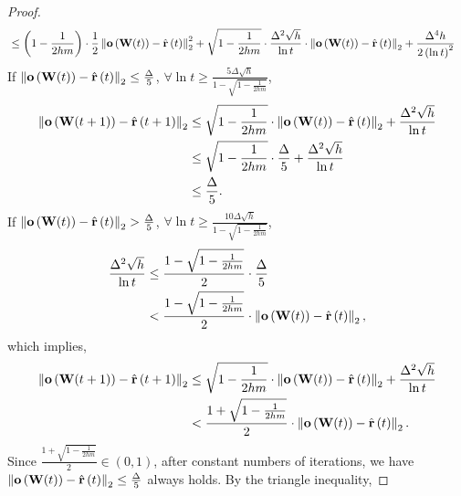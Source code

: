 \begin{proof}
\begin{equation*}
\begin{split}
    &\le \left( 1 - \frac{1}{2 h m } \right) \cdot \frac{1}{2} \left\| {\mathbf{o}}\left( {\mathbf{W}}(t) \right) - \hat{{\mathbf{r}}}\left(t\right)\right\|_2^2 + \sqrt{1 - \frac{1}{2 h m } } \cdot \frac{\Delta^2 \sqrt{h}}{\ln{t}} \cdot \left\| {\mathbf{o}}\left( {\mathbf{W}}(t) \right) - \hat{{\mathbf{r}}}\left(t\right)\right\|_2 + \frac{\Delta^4 h}{2 \left( \ln{t} \right)^2 }
\end{split}
\end{equation*}
If $\left\| {\mathbf{o}}\left( {\mathbf{W}}(t) \right) - \hat{{\mathbf{r}}}\left(t\right)\right\|_2 \le \frac{\Delta}{5}$, $\forall \ln{t} \ge \frac{5 \Delta \sqrt{h}}{1 - \sqrt{1 - \frac{1}{2 h m}}}$,
\begin{equation*}
\begin{split}
    \left\| {\mathbf{o}}\left( {\mathbf{W}}(t+1) \right) - \hat{{\mathbf{r}}}\left(t+1\right)\right\|_2 &\le \sqrt{1 - \frac{1}{2 h m}} \cdot \left\| {\mathbf{o}}\left( {\mathbf{W}}(t) \right) - \hat{{\mathbf{r}}}\left(t\right)\right\|_2 + \frac{\Delta^2 \sqrt{h}}{\ln{t}} \\
    &\le \sqrt{1 - \frac{1}{2 h m}} \cdot \frac{\Delta}{5} + \frac{\Delta^2 \sqrt{h}}{\ln{t}} \\
    &\le \frac{\Delta}{5}.
\end{split}
\end{equation*}
If $\left\| {\mathbf{o}}\left( {\mathbf{W}}(t) \right) - \hat{{\mathbf{r}}}\left(t\right)\right\|_2 > \frac{\Delta}{5}$, $\forall \ln{t} \ge \frac{10 \Delta \sqrt{h}}{1 - \sqrt{1 - \frac{1}{2 h m}}}$,
\begin{equation*}
\begin{split}
    \frac{\Delta^2 \sqrt{h}}{\ln{t}} &\le \frac{1 - \sqrt{1 - \frac{1}{2 h m}}}{2} \cdot \frac{\Delta}{5} \\
    &< \frac{1 - \sqrt{1 - \frac{1}{2 h m}}}{2} \cdot \left\| {\mathbf{o}}\left( {\mathbf{W}}(t) \right) - \hat{{\mathbf{r}}}\left(t\right)\right\|_2,
\end{split}
\end{equation*}
which implies,
\begin{equation*}
\begin{split}
    \left\| {\mathbf{o}}\left( {\mathbf{W}}(t+1) \right) - \hat{{\mathbf{r}}}\left(t+1\right)\right\|_2 &\le \sqrt{1 - \frac{1}{2 h m}} \cdot \left\| {\mathbf{o}}\left( {\mathbf{W}}(t) \right) - \hat{{\mathbf{r}}}\left(t\right)\right\|_2 + \frac{\Delta^2 \sqrt{h}}{\ln{t}} \\
    &< \frac{1 + \sqrt{1 - \frac{1}{2 h m}}}{2} \cdot \left\| {\mathbf{o}}\left( {\mathbf{W}}(t) \right) - \hat{{\mathbf{r}}}\left(t\right)\right\|_2.
\end{split}
\end{equation*}
Since $\frac{1 + \sqrt{1 - \frac{1}{2 h m}}}{2} \in \left(0, 1\right)$, after constant numbers of iterations, we have $\left\| {\mathbf{o}}\left( {\mathbf{W}}(t) \right) - \hat{{\mathbf{r}}}\left(t\right)\right\|_2 \le \frac{\Delta}{5}$ always holds. By the triangle inequality,

\end{proof}
